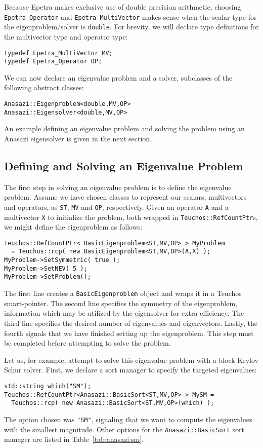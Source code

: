 Because Epetra makes exclusive use of double precision arithmetic,
choosing \verb!Epetra_Operator!  and \verb!Epetra_MultiVector!  makes
sense when the scalar type for the eigenproblem/solver is
\verb!double!. For brevity, we will declare type definitions for the
multivector type and operator type:
\begin{verbatim}
typedef Epetra_MultiVector MV;
typedef Epetra_Operator OP;
\end{verbatim}

We can now declare an eigenvalue problem and a solver, subclasses of
the following abstract classes:
\begin{verbatim}
Anasazi::Eigenproblem<double,MV,OP>
Anasazi::Eigensolver<double,MV,OP>
\end{verbatim}

An example defining an eigenvalue problem and solving the problem
using an Anasazi eigensolver is given in the next section.

\subsection{Defining and Solving an Eigenvalue Problem}
\label{sec:anasazi:example}

The first step in solving an eigenvalue problem is to define the eigenvalue
problem. Assume we have chosen classes to represent our scalars, multivectors
and operators, as \verb!ST!, \verb!MV! and \verb!OP!, respectively. Given an
operator \verb!A! and a multivector \verb!X! to initialize the problem, both
wrapped in \verb!Teuchos::RefCountPtr!s, we might define the eigenproblem as
follows:
\begin{verbatim}
Teuchos::RefCountPtr< BasicEigenproblem<ST,MV,OP> > MyProblem 
  = Teuchos::rcp( new BasicEigenproblem<ST,MV,OP>(A,X) );
MyProblem->SetSymmetric( true );
MyProblem->SetNEV( 5 );
MyProblem->SetProblem();
\end{verbatim}

The first line creates a \verb!BasicEigenproblem! object and wraps it
in a Teuchos smart-pointer. The second line specifies the symmetry of
the eigenproblem, information which may be utilized by the eigensolver
for extra efficiency. The third line specifies the desired number of
eigenvalues and eigenvectors. Lastly, the fourth signals that we have
finished setting up the eigenproblem. This step must be completed
before attempting to solve the problem.

Let us, for example, attempt to solve this eigenvalue problem with a
block Krylov Schur solver. First, we declare a sort manager to specify the
targeted eigenvalues:
\begin{verbatim}
std::string which("SM");
Teuchos::RefCountPtr<Anasazi::BasicSort<ST,MV,OP> > MySM =
  Teuchos::rcp( new Anasazi::BasicSort<ST,MV,OP>(which) );
\end{verbatim}
The option chosen was \verb!"SM"!, signaling that we want to compute
the eigenvalues with the smallest magnitude. Other options for the
\verb!Anasazi::BasicSort! sort manager are listed in
Table~\ref{tab:anasazi:sm}.

